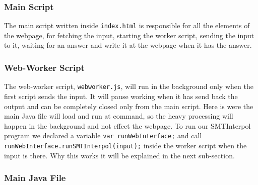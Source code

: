 \documentclass[12pt]{article}
\begin{document}
\subsubsection{Main Script}

The main script written inside \texttt{index.html} is responsible for all the elements of the webpage, for fetching the input, starting the worker script, sending the input to it, waiting for an answer and write it at the webpage when it has the answer.

\subsubsection{Web-Worker Script} 

The web-worker script, \texttt{webworker.js}, will run in the background only when the first script sends the input. It will pause working when it has send back the output and can be completely closed only from the main script.
Here is were the main Java file will load and run at command, so the heavy processing will happen in the background and not effect the webpage. To run our SMTInterpol program we declared a variable \verb|var runWebInterface;| and call \verb|runWebInterface.runSMTInterpol(input);| inside the worker script when the input is there. Why this works it will be explained in the next sub-section.

\subsubsection{Main Java File}
\end{document}
